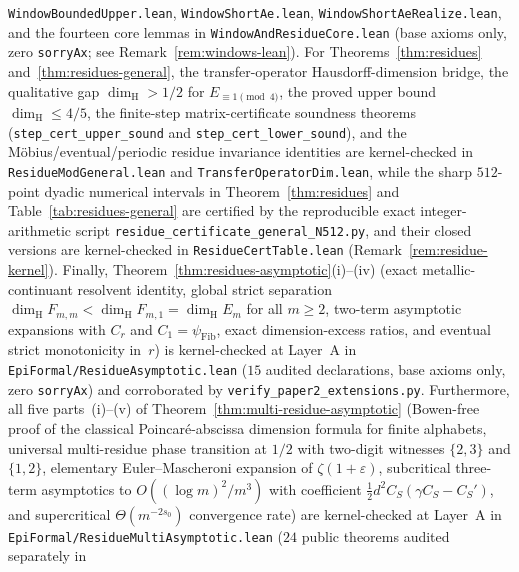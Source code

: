 \documentclass[11pt]{article}
\theoremstyle{definition}
\theoremstyle{remark}
\newcommand{\dimH}{\dim_{\mathrm{H}}}
\begin{document}
\begin{itemize}[leftmargin=1.5em]
\texttt{Window\allowbreak Bounded\allowbreak Upper.lean},
\texttt{Window\allowbreak Short\allowbreak Ae.lean},
\texttt{Window\allowbreak Short\allowbreak Ae\allowbreak Realize.lean}, and the fourteen
core lemmas in \texttt{Window\allowbreak And\allowbreak Residue\allowbreak Core.lean}
(base axioms only, zero \texttt{sorryAx}; see Remark~\ref{rem:windows-lean}).
For Theorems~\ref{thm:residues} and~\ref{thm:residues-general}, the
transfer-operator Hausdorff-dimension bridge, the qualitative gap
$\dimH > 1/2$ for $E_{\equiv 1\pmod 4}$, the proved upper bound
$\dimH \le 4/5$, the finite-step matrix-certificate soundness theorems
(\texttt{step\_\allowbreak cert\_\allowbreak upper\_\allowbreak sound} and
\texttt{step\_\allowbreak cert\_\allowbreak lower\_\allowbreak sound}), and
the M\"obius/eventual/periodic residue invariance identities are kernel-checked
in \texttt{Residue\allowbreak ModGeneral.lean} and
\texttt{Transfer\allowbreak Operator\allowbreak Dim.lean}, while the sharp
$512$-point dyadic numerical intervals in Theorem~\ref{thm:residues} and
Table~\ref{tab:residues-general} are certified by the reproducible exact
integer-arithmetic script \texttt{residue\_\allowbreak certificate\_\allowbreak general\_\allowbreak N512.py},
and their closed versions are kernel-checked in
\texttt{Residue\allowbreak Cert\allowbreak Table.lean} (Remark~\ref{rem:residue-kernel}). Finally,
Theorem~\ref{thm:residues-asymptotic}(i)--(iv) (exact metallic-continuant
resolvent identity, global strict separation $\dimH F_{m,m}<\dimH F_{m,1}=\dimH E_m$
for all $m\ge2$, two-term asymptotic expansions with $C_r$ and $C_1=\psi_{\mathrm{Fib}}$,
exact dimension-excess ratios, and eventual strict monotonicity in~$r$) is
kernel-checked at Layer~A in
\texttt{EpiFormal/\allowbreak Residue\allowbreak Asymptotic.lean} ($15$ audited
declarations, base axioms only, zero \texttt{sorryAx}) and corroborated by
\texttt{verify\_\allowbreak paper2\_\allowbreak extensions.py}. Furthermore,
all five parts~(i)--(v) of Theorem~\ref{thm:multi-residue-asymptotic}
(Bowen-free proof of the classical Poincar\'e-abscissa dimension formula for
finite alphabets, universal
multi-residue phase transition at $1/2$ with two-digit witnesses $\{2,3\}$
and $\{1,2\}$, elementary Euler--Mascheroni expansion of $\zeta(1+\varepsilon)$,
subcritical three-term asymptotics to $O((\log m)^2/m^3)$ with coefficient
$\frac12 d^2 C_S(\gamma C_S-C_S')$, and supercritical $\Theta(m^{-2s_0})$
convergence rate) are kernel-checked at Layer~A in
\texttt{EpiFormal/\allowbreak Residue\allowbreak Multi\allowbreak Asymptotic.lean}
($24$ public theorems audited separately in

\end{itemize}
\end{document}
